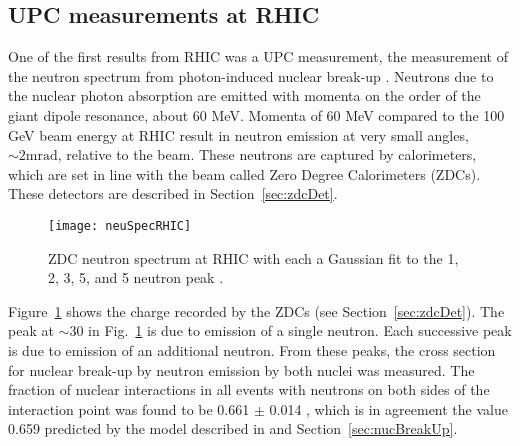   \subsection{ UPC measurements at RHIC }
    One of the first results from RHIC was a UPC measurement, the measurement of the 
      neutron spectrum from photon-induced nuclear break-up \cite{upcNeuPHENIX}.
    Neutrons due to the nuclear photon absorption are emitted with momenta on the
      order of the giant dipole resonance, about 60 MeV.
    Momenta of 60 MeV compared to the 100 GeV beam energy at RHIC result in 
      neutron emission at very small angles, $\sim 2 \textrm{mrad}$, relative to 
      the beam.
    These neutrons are captured by calorimeters, which are set in line with the 
      beam called Zero Degree Calorimeters (ZDCs).
    These detectors are described in Section~\ref{sec:zdcDet}.
    \begin{figure}[!Hhbt]
      \centering
      \texttt{[image: neuSpecRHIC]}
      \caption{ZDC neutron spectrum at RHIC with each a Gaussian fit 
         to the 1, 2, 3, 5, and 5 neutron peak \cite{upcNeuPHENIX}.}
      \label{fig:neuSpecRHIC}
    \end{figure}
    Figure~\ref{fig:neuSpecRHIC} shows the charge recorded by the ZDCs (see Section~\ref{sec:zdcDet}).
    The peak at $\sim 30$ in Fig.~\ref{fig:neuSpecRHIC} is due to emission of a 
      single neutron. 
    Each successive peak is due to emission of an additional neutron. 
    From these peaks, the cross section for nuclear break-up by neutron 
      emission by both nuclei was measured.
    The fraction of nuclear interactions in all events with neutrons on both sides
      of the interaction point was found to be 0.661 $\pm$ 0.014 \cite{upcNeuPHENIX},
      which is in agreement the value 0.659 predicted by the model described in 
      \cite{emPCite4} and Section~\ref{sec:nucBreakUp}.

